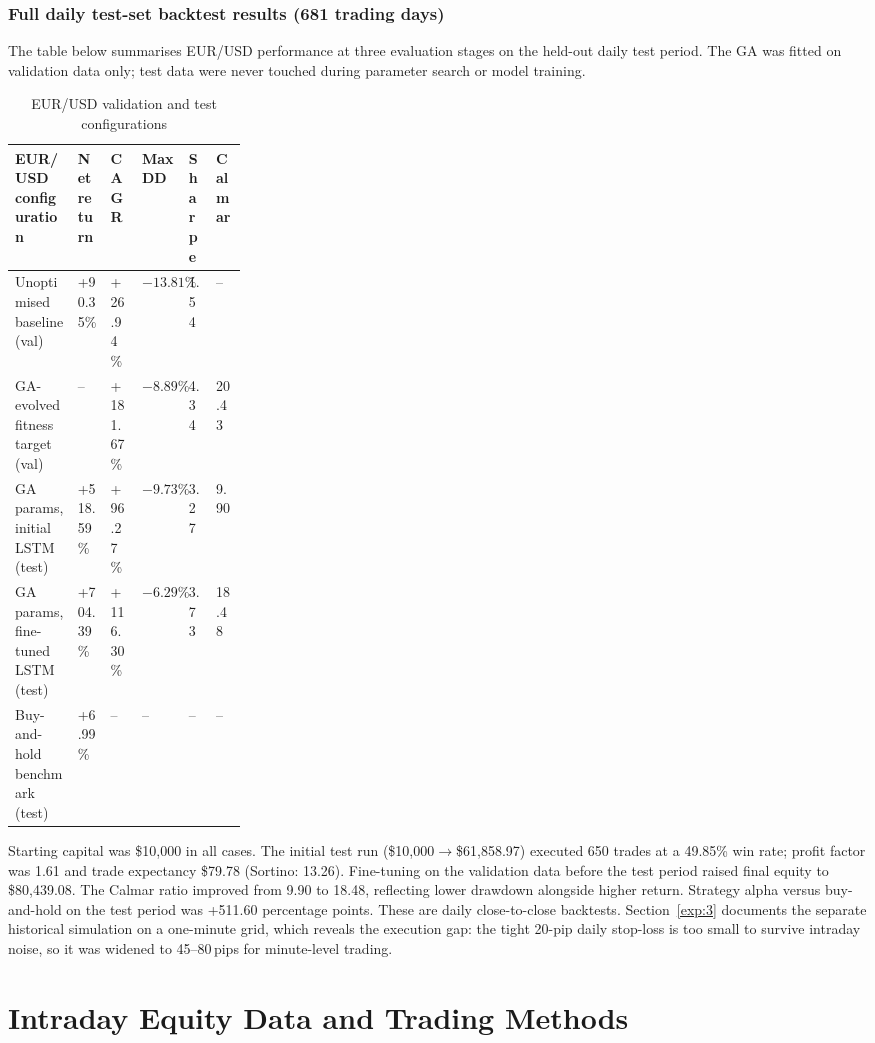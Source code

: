\documentclass[12pt,a4paper,twoside,openany]{report}
\begin{document}
\subsection*{Full daily test-set backtest results (681 trading days)}
The table below summarises EUR/USD performance at three evaluation stages on the held-out daily test period. The GA was fitted on validation data only; test data were never touched during parameter search or model training.
\begin{table}[htbp]\centering\singlespacing
\caption{EUR/USD validation and test configurations}
\begin{tabularx}{\linewidth}{@{}p{0.27\linewidth}XXXXX@{}}
\toprule
EUR/USD configuration & Net return & CAGR & Max DD & Sharpe & Calmar\\\midrule
Unoptimised baseline (val) & +90.35\% & +26.94\% & $-13.81\%$ & 1.54 & --\\
GA-evolved fitness target (val) & -- & +181.67\% & $-8.89\%$ & 4.34 & 20.43\\
GA params, initial LSTM (test) & +518.59\% & +96.27\% & $-9.73\%$ & 3.27 & 9.90\\
GA params, fine-tuned LSTM (test) & +704.39\% & +116.30\% & $-6.29\%$ & 3.73 & 18.48\\
Buy-and-hold benchmark (test) & +6.99\% & -- & -- & -- & --\\
\bottomrule
\end{tabularx}
\end{table}
Starting capital was \$10{,}000 in all cases. The initial test run (\$10{,}000$\to$\$61{,}858.97) executed 650 trades at a 49.85\% win rate; profit factor was 1.61 and trade expectancy \$79.78 (Sortino: 13.26). Fine-tuning on the validation data before the test period raised final equity to \$80{,}439.08. The Calmar ratio improved from 9.90 to 18.48, reflecting lower drawdown alongside higher return. Strategy alpha versus buy-and-hold on the test period was +511.60 percentage points.
These are daily close-to-close backtests. Section~\ref{exp:3} documents the separate historical simulation on a one-minute grid, which reveals the execution gap: the tight 20-pip daily stop-loss is too small to survive intraday noise, so it was widened to 45--80\,pips for minute-level trading.\par

\chapter{Intraday Equity Data and Trading Methods}
\end{document}
